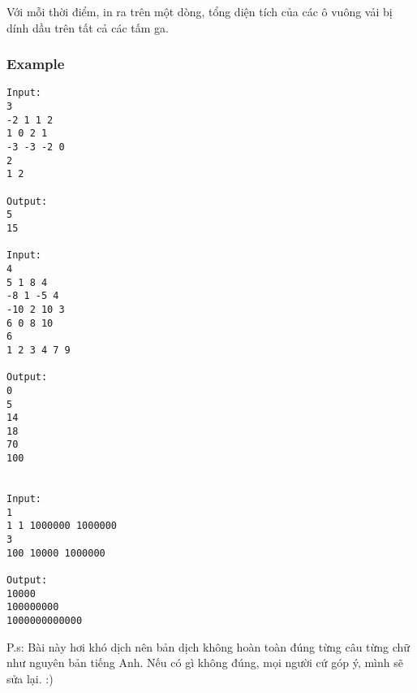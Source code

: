    Với mỗi thời điểm, in ra trên một dòng, tổng diện tích của các ô vuông vải bị dính dầu trên tất cả các tấm ga.  

\subsubsection{   Example  }
\begin{verbatim}
Input:
3
-2 1 1 2
1 0 2 1
-3 -3 -2 0
2
1 2

Output:
5
15

Input:
4
5 1 8 4
-8 1 -5 4
-10 2 10 3
6 0 8 10
6
1 2 3 4 7 9

Output:
0
5
14
18
70
100


Input:
1
1 1 1000000 1000000
3
100 10000 1000000

Output:
10000
100000000
1000000000000

\end{verbatim}

   P.s: Bài này hơi khó dịch nên bản dịch không hoàn toàn đúng từng câu từng chữ như nguyên bản tiếng Anh. Nếu có gì không đúng, mọi người cứ góp ý, mình sẽ sửa lại. :)  